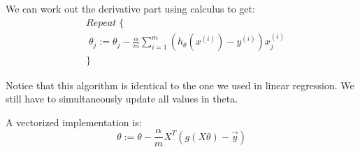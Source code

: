\documentclass{article}
\begin{document}
We can work out the derivative part using calculus to get:
\begin{align*} 
	& Repeat \; \lbrace \\ 
	& \; \theta_j := \theta_j - \frac{\alpha}{m} \sum_{i=1}^m (h_\theta(x^{(i)}) - y^{(i)}) x_j^{(i)} \\ 
	& \rbrace 
\end{align*}

Notice that this algorithm is identical to the one we used in linear regression. We still have to simultaneously update all values in theta.

A vectorized implementation is:
$$\theta := \theta - \frac{\alpha}{m} X^{T} (g(X \theta ) - \vec{y})$$
\end{document}
